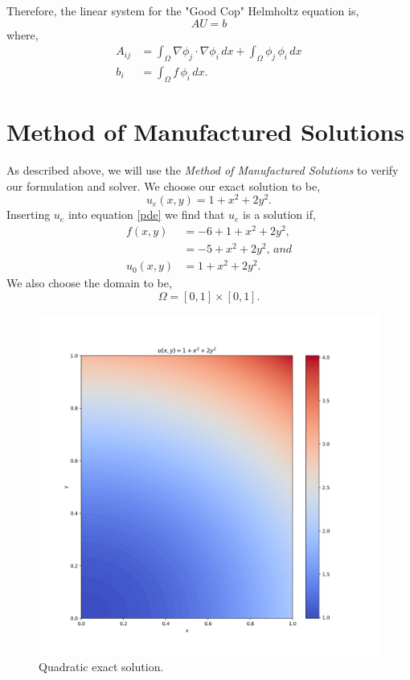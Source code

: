 Therefore, the linear system for the "Good Cop" Helmholtz equation is,
\begin{equation}
A U = b
\end{equation}
where,
\begin{align}
A_{ij} &= \int_{\Omega} \nabla \phi_j \cdot \nabla \phi_i \, dx + \int_{\Omega} \phi_j \, \phi_i \, dx \\
b_i &= \int_{\Omega} f \, \phi_i \, dx.
\end{align}

\section{Method of Manufactured Solutions}

As described above, we will use the \textit{Method of Manufactured Solutions} to verify our formulation and solver.  We choose our exact solution to be,
\begin{equation}
u_e(x,y) = 1 + x^2 + 2 y^2.
\end{equation}
Inserting $u_e$ into equation \eqref{pde} we find that $u_e$ is a solution if,
\begin{align}
f(x,y) &= -6 + 1 + x^2 + 2 y^2, \\
      &= -5 + x^2 + 2 y^2, \, and \\
u_0(x,y) &= 1 + x^2 + 2 y^2.
\end{align}
We also choose the domain to be,
\begin{equation}
\Omega = [0,1] \times [0,1].
\end{equation}
\begin{figure}[!ht]
\begin{center}
\includegraphics[scale=0.4]{figures/Quad_Exact.png}
\end{center}
\caption{Quadratic exact solution.}
\label{QuadExact}
\end{figure}


